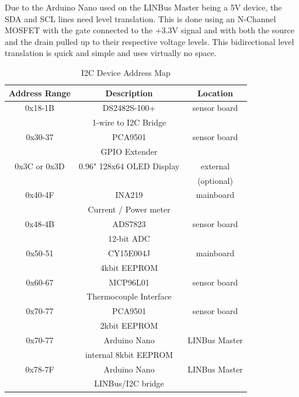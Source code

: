 \documentclass[lettersize,journal]{IEEEtran}
\begin{document}
Due to the Arduino Nano used on the LINBus Master being a 5V device, the SDA and SCL lines need level translation.  This is done using an N-Channel MOSFET with the gate connected to the +3.3V signal and with both the source and the drain pulled up to their respective voltage levels.  This bidirectional level translation is quick and simple and uses virtually no space.

\begin{table}
\begin{center}
\caption{I2C Device Address Map}
\label{i2c-addresses}
\begin{tabular}{| c | c | c |}
\hline
Address Range & Description & Location \\
\hline
0x18-1B & DS2482S-100+ & sensor board \\
& 1-wire to I2C Bridge & \\
\hline
0x30-37 & PCA9501 & sensor board \\
& GPIO Extender & \\
\hline
0x3C or 0x3D & 0.96" 128x64 OLED Display & external \\
& & (optional) \\
\hline
0x40-4F & INA219 & mainboard \\
& Current / Power meter & \\
\hline
0x48-4B & ADS7823 & sensor board \\
& 12-bit ADC & \\
\hline
0x50-51 & CY15E004J & mainboard \\
& 4kbit EEPROM & \\
\hline
0x60-67 & MCP96L01 & sensor board \\
& Thermocouple Interface & \\
\hline
0x70-77 & PCA9501 & sensor board \\
& 2kbit EEPROM & \\
\hline
0x70-77 & Arduino Nano & LINBus Master \\
& internal 8kbit EEPROM & \\
\hline
0x78-7F & Arduino Nano & LINBus Master \\
& LINBus/I2C bridge & \\
\hline
\end{tabular}
\end{center}
\end{table}
\end{document}
